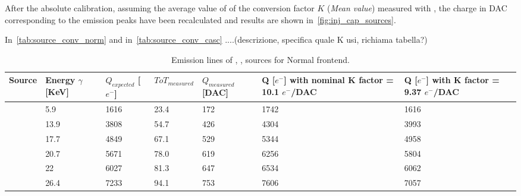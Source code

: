 After the absolute calibration, assuming the average value of of the conversion factor $K$ (\textit{Mean value}) measured with , the charge in DAC corresponding to the emission peaks have been recalculated and results are shown in~\autoref{fig:inj_cap_sources}.

In~\autoref{tab:source_conv_norm} and in~\autoref{tab:source_conv_casc}   ....(descrizione, specifica quale K usi, richiama tabella?)

\begin{table}[h!]
\centering
\begin{tabular}{>{} C{1.8cm}|C{1.8cm}|C{1.8cm}|C{1.8cm}|C{1.8cm}|C{1.8cm}|C{1.8cm}}
Source & Energy $\gamma$ [KeV] & $Q_{expected}$ [$e^{-}$] & $ToT_{measured}$ & $Q_{measured}$ [DAC] & Q [$e^{-}$] \footnotesize{with nominal K factor = 10.1 $e^{-}$/DAC} & Q [$e^{-}$] \footnotesize{with  K factor = 9.37 $e^{-}$/DAC}\\[2ex]
\hline
{} & 5.9 & 1616 & 23.4 & 172 & 1742 & 1616 \\[0.5ex]
\hline
{} & 13.9 & 3808 & 54.7 & 426 & 4304 & 3993 \\[0.5ex]
\hline
{} & 17.7 & 4849 & 67.1 & 529 & 5344 & 4958 \\[0.5ex]
\hline
{} & 20.7 & 5671 & 78.0 & 619 & 6256 & 5804 \\[0.5ex]
\hline
{} & 22 & 6027 & 81.3 & 647 & 6534 & 6062 \\[0.5ex]
\hline
{} & 26.4 & 7233 & 94.1 & 753 & 7606 & 7057 \\[0.5ex]
\hline
\end{tabular}
\caption{Emission lines of , ,  sources for Normal frontend.}
\label{tab:source_conv_norm}
\end{table}



